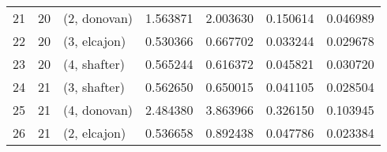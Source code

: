 \begin{tabular}{lllrrrr}
21 &    20 &  (2, donovan) &  1.563871 &  2.003630 &   0.150614 &  0.046989 \\
22 &    20 &  (3, elcajon) &  0.530366 &  0.667702 &   0.033244 &  0.029678 \\
23 &    20 &  (4, shafter) &  0.565244 &  0.616372 &   0.045821 &  0.030720 \\
24 &    21 &  (3, shafter) &  0.562650 &  0.650015 &   0.041105 &  0.028504 \\
25 &    21 &  (4, donovan) &  2.484380 &  3.863966 &   0.326150 &  0.103945 \\
26 &    21 &  (2, elcajon) &  0.536658 &  0.892438 &   0.047786 &  0.023384 \\
\bottomrule
\end{tabular}
